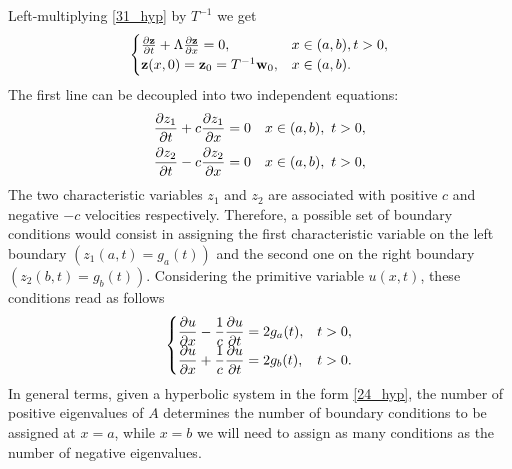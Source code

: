 Left-multiplying \eqref{31_hyp} by \(T^{-1}\) we get 
\begin{equation}
    \begin{cases}
        \partialderivative{\vect{z}}{t} + \Lambda \partialderivative{\vect{z}}{x} = 0, & x \in (a,b), t > 0, \\
        \vect{z}(x,0) = \vect{z}_0 = T^{-1} \vect{w}_0, & x \in (a,b).
    \end{cases}
    \label{32_hyp}
\end{equation}
The first line can be decoupled into two independent equations: 
\begin{align*}
    &\partialderivative{z_1}{t} + c \partialderivative{z_1}{x} = 0  & x\in (a,b), \ t >0, \\
    &\partialderivative{z_2}{t} - c \partialderivative{z_2}{x} = 0  & x\in (a,b), \ t >0, \\
\end{align*}
The two characteristic variables \(z_1\) and \(z_2\) are associated with positive \(c\) and negative \(-c\) velocities respectively. 
Therefore, a possible set of boundary conditions would consist in assigning the first characteristic variable on the left boundary \((z_1(a,t) = g_a(t))\) and the second one on the right boundary \((z_2(b, t)=g_b(t))\). Considering the primitive variable \(u(x,t)\), these conditions read as follows 
\begin{equation}
    \begin{cases}
        \displaystyle \partialderivative{u}{x}(a,t) -\frac{1}{c}\partialderivative{u}{t}(a,t) = 2 g_a (t), & t > 0, \\
        \displaystyle  \partialderivative{u}{x}(b,t) + \frac{1}{c} \partialderivative{u}{t}(b,t) = 2 g_b (t), & t> 0.
    \end{cases}
    \label{33_hyp}
\end{equation}
In general terms, given a hyperbolic system in the form \eqref{24_hyp}, the number of positive eigenvalues of \(A\) determines the number of boundary conditions to be assigned at \(x=a\), while \(x=b\) we will need to assign as many conditions as the number of negative eigenvalues. 
